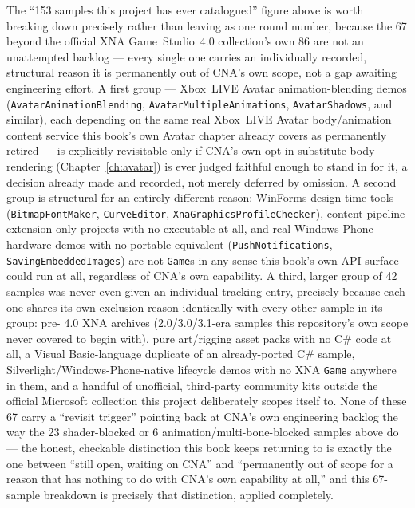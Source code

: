 The ``153 samples this project has ever catalogued'' figure above is worth breaking down
precisely rather than leaving as one round number, because the 67 beyond the official XNA
Game~Studio~4.0 collection's own 86 are not an unattempted backlog --- every single one carries
an individually recorded, structural reason it is permanently out of CNA's own scope, not a gap
awaiting engineering effort. A first group --- Xbox~LIVE Avatar animation-blending demos
(\texttt{AvatarAnimationBlending}, \texttt{AvatarMultipleAnimations},
\texttt{AvatarShadows}, and similar), each depending on the same real Xbox~LIVE Avatar
body/animation content service this book's own Avatar chapter already covers as permanently
retired --- is explicitly revisitable only if CNA's own opt-in substitute-body rendering
(Chapter~\ref{ch:avatar}) is ever judged faithful enough to stand in for it, a decision already
made and recorded, not merely deferred by omission. A second group is structural for an entirely
different reason: WinForms design-time tools (\texttt{BitmapFontMaker}, \texttt{CurveEditor},
\texttt{XnaGraphicsProfileChecker}), content-pipeline-extension-only projects with no
executable at all, and real Windows-Phone-hardware demos with no portable equivalent
(\texttt{PushNotifications}, \texttt{SavingEmbeddedImages}) are not \texttt{Game}s in any sense
this book's own API surface could run at all, regardless of CNA's own capability. A third,
larger group of 42 samples was never even given an individual tracking entry, precisely because
each one shares its own exclusion reason identically with every other sample in its group: pre-%
4.0 XNA archives (2.0/3.0/3.1-era samples this repository's own scope never covered to begin
with), pure art/rigging asset packs with no C\# code at all, a Visual Basic-language duplicate of
an already-ported C\# sample, Silverlight/Windows-Phone-native lifecycle demos with no XNA
\texttt{Game} anywhere in them, and a handful of unofficial, third-party community kits outside
the official Microsoft collection this project deliberately scopes itself to. None of these 67
carry a ``revisit trigger'' pointing back at CNA's own engineering backlog the way the 23
shader-blocked or 6 animation/multi-bone-blocked samples above do --- the honest, checkable
distinction this book keeps returning to is exactly the one between ``still open, waiting on
CNA'' and ``permanently out of scope for a reason that has nothing to do with CNA's own
capability at all,'' and this 67-sample breakdown is precisely that distinction, applied
completely.

